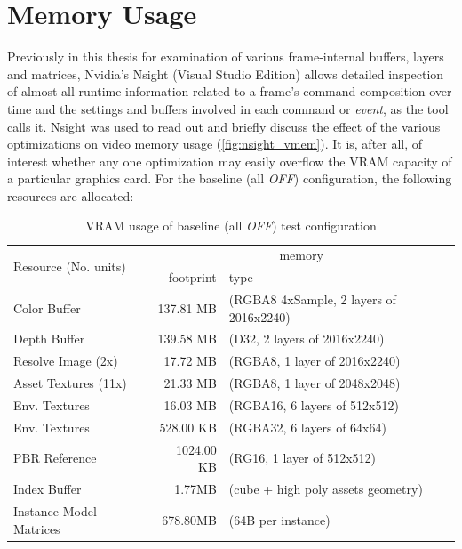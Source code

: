 
\section{Memory Usage}
Previously in this thesis for examination of various frame-internal buffers, layers and matrices, Nvidia's Nsight (Visual Studio Edition) allows detailed inspection of almost all runtime information related to a frame's command composition over time and the settings and buffers involved in each command or \textit{event}, as the tool calls it. Nsight was used to read out and briefly discuss the effect of the various optimizations on video memory usage (\autoref{fig:nsight_vmem}). It is, after all, of interest whether any one optimization may easily overflow the VRAM capacity of a particular graphics card. 
For the baseline (all \textit{OFF}) configuration, the following resources are allocated: 

\begin{table}[H]
  \caption[VRAM usage of baseline test configuration]{VRAM usage of baseline (all \textit{OFF}) test configuration}\label{tab:vmem_baseline}
  \centering
  \begin{tabular}{l || r l }
    \toprule
  	\multirow{2}{*}{Resource (No. units)} & 
  		\multicolumn{2}{c}{memory} \\
        & {footprint} & {type} \\
    \midrule
      Color Buffer	& 137.81 MB & (RGBA8 4xSample, 2 layers of 2016x2240) \\
      Depth Buffer	& 139.58 MB & (D32, 2 layers of 2016x2240) \\
      Resolve Image (2x)	& 17.72 MB & (RGBA8, 1 layer of 2016x2240) \\
      Asset Textures (11x)	& 21.33 MB & (RGBA8, 1 layer of 2048x2048) \\
      Env. Textures	& 16.03 MB & (RGBA16, 6 layers of 512x512) \\
      Env. Textures	& 528.00 KB & (RGBA32, 6 layers of 64x64) \\
      PBR Reference	& 1024.00 KB & (RG16, 1 layer of 512x512) \\
    \midrule
      Index Buffer	& 1.77MB & (cube + high poly assets geometry) \\
      Instance Model Matrices	& 678.80MB & (64B per instance) \\
    \bottomrule
  \end{tabular}
\end{table} 

